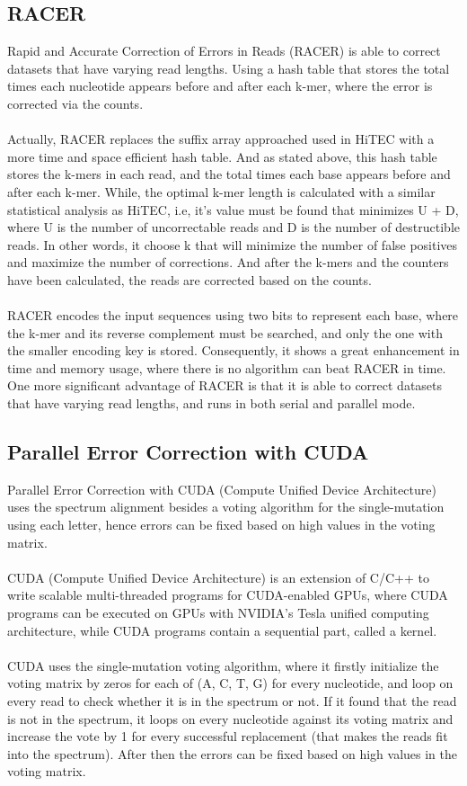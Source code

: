 \documentclass[12pt,openany]{llncs}
\begin{document}
\subsection{RACER}
Rapid and Accurate Correction of Errors in Reads (RACER) \cite{Racer} is able to correct datasets that have varying read lengths. Using a hash table that stores the total times each nucleotide appears before and after each k-mer, where the error is corrected via the counts.
\\
\\
Actually, RACER replaces the suffix array approached used in HiTEC with a more time and space efficient hash table. And as stated above, this hash table stores the k-mers in each read, and the total times each base appears before and after each k-mer. While, the optimal k-mer length is calculated with a similar statistical analysis as HiTEC, i.e, it's value must be found that minimizes U + D, where U is the number of uncorrectable reads and D is the number of destructible reads. In other words, it choose k that will minimize the number of false positives and maximize the number of corrections. And after the k-mers and the counters have been calculated, the reads are corrected based on the counts.
\\
\\
RACER encodes the input sequences using two bits to represent each base, where the k-mer and its reverse complement must be searched, and only the one with the smaller encoding key is stored. Consequently, it shows a great enhancement in time and memory usage, where there is no algorithm can beat RACER in time.
\\
One more significant advantage of RACER is that it is able to correct datasets that have varying read lengths, and runs in both serial and parallel mode.
 

\subsection{Parallel Error Correction with CUDA}
Parallel Error Correction with CUDA (Compute Unified Device Architecture) \cite{Cuda} uses the spectrum alignment besides a voting algorithm for the single-mutation using each letter, hence errors can be fixed based on high values in the voting matrix.
\\
\\
CUDA (Compute Unified Device Architecture) is an extension of C/C++ to write scalable multi-threaded programs for CUDA-enabled GPUs, where CUDA programs can be executed on GPUs with NVIDIA’s Tesla unified computing architecture, while CUDA programs contain a sequential part, called a kernel.
\\
\\
CUDA uses the single-mutation voting algorithm, where it firstly initialize the voting matrix by zeros for each of (A, C, T, G) for every nucleotide, and loop on every read to check whether it is in the spectrum or not. If it found that the read is not in the spectrum, it loops on every nucleotide against its voting matrix and increase the vote by 1 for every successful replacement (that makes the reads fit into the spectrum). After then the errors can be fixed based on high values in the voting matrix.
\end{document}
